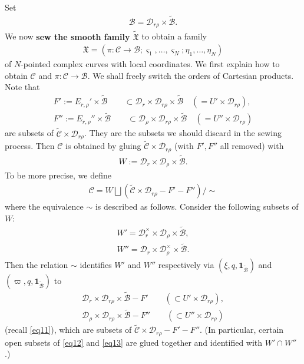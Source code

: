 \documentclass[12pt,a4paper,notitlepage]{article}
\theoremstyle{definition}
\theoremstyle{plain}
\newcommand{\fk}{\mathfrak}
\newcommand{\mc}{\mathcal}
\newcommand{\wtd}{\widetilde}
\newcommand{\id}{\mathbf{1}}
\newcommand{\sgm}{\varsigma}
\numberwithin{equation}{section}
\begin{document}
Set
\begin{align}
\mc B=\mc D_{r\rho}\times\wtd{\mc B}.
\end{align}
We now \textbf{sew the smooth family $\wtd{\fk X}$} to obtain a family 
\begin{align*}
\fk X=(\pi:\mc C\rightarrow\mc B;\sgm_1,\dots,\sgm_N;\eta_1,\dots,\eta_N)
\end{align*}
of $N$-pointed  complex curves  with local coordinates. We first explain how to obtain $\mc C$ and $\pi:\mc C\rightarrow\mc B$. We shall freely switch the orders of Cartesian products. Note  that
\begin{gather*}
F':=E_{r,\rho}'\times\wtd{\mc B}\qquad\subset \mc D_{r}\times\mc D_{r\rho}\times\wtd{\mc B}\quad(= U'\times \mc D_{r\rho}),\\
F'':=E_{r,\rho}''\times\wtd{\mc B}\qquad\subset \mc D_{\rho}\times\mc D_{r\rho}\times\wtd{\mc B}\quad(= U''\times \mc D_{r\rho})
\end{gather*}
are subsets of $\wtd{\mc C}\times\mc D_{r\rho}$. They are the subsets  we should discard in the sewing process.  Then $\mc C$ is obtained by gluing $\wtd{\mc C}\times \mc D_{r\rho}$ (with $F',F''$ all removed)  with
\begin{align}
W:=\mc D_{r}\times\mc D_{\rho}\times\wtd{\mc B}.\label{eq10}
\end{align}
To be more precise, we define
\begin{align}
\mc C=W\bigsqcup(\wtd{\mc C}\times \mc D_{r\rho}-F'- F'')\Big/\sim \label{eq67}
\end{align}
where the equivalence $\sim$ is described as follows. Consider the following subsets of $W$:
\begin{gather}
W'=\mc D_{r}^\times\times\mc D_{\rho}\times\wtd{\mc B},\\
W''= \mc D_{r}\times\mc D_{\rho}^\times\times\wtd{\mc B}.
\end{gather}
Then the relation $\sim$ identifies $W'$ and $W''$  respectively via $(\xi,q,\id_{\wtd{\mc B}})$ and $(\varpi,q,\id_{\wtd{\mc B}})$  to
\begin{gather}
\mc D_{r}\times\mc D_{r\rho}\times\wtd{\mc B}-F'\qquad (\subset U'\times\mc D_{r\rho}),\label{eq12}\\
\mc D_{\rho}\times\mc D_{r\rho}\times\wtd{\mc B}-F''\qquad (\subset U''\times\mc D_{r\rho})\label{eq13}
\end{gather}
(recall \eqref{eq11}), which are subsets of $\wtd{\mc C}\times \mc D_{r\rho}-F'-F''$. (In particular, certain open subsets of \eqref{eq12} and \eqref{eq13} are glued together and identified with $W'\cap W''$.)
\end{document}
